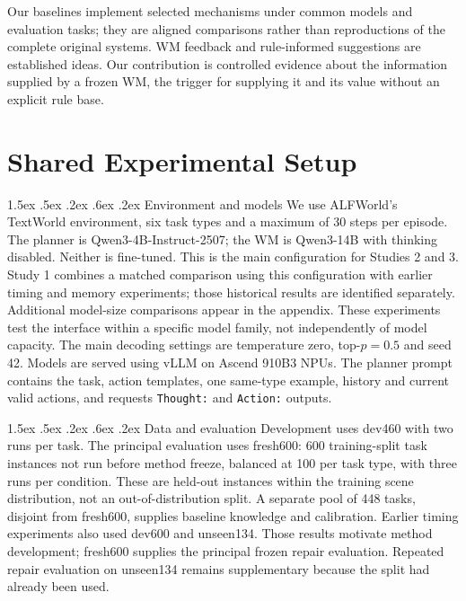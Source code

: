 \documentclass[runningheads]{llncs}
\makeatletter
\renewcommand\paragraph{\@startsection{paragraph}{4}{\z@}%
  {1.5ex \@plus .5ex \@minus .2ex}%
  {.6ex \@plus .2ex}%
  {\normalfont\normalsize\bfseries}}
\makeatother
\begin{document}
Our baselines implement selected mechanisms under common models and evaluation tasks; they are aligned comparisons rather than reproductions of the complete original systems. WM feedback and rule-informed suggestions are established ideas. Our contribution is controlled evidence about the information supplied by a frozen WM, the trigger for supplying it and its value without an explicit rule base.

\section{Shared Experimental Setup}\label{sec:setup}
\paragraph{Environment and models}
We use ALFWorld's TextWorld environment, six task types and a maximum of 30 steps per episode. The planner is Qwen3-4B-Instruct-2507; the WM is Qwen3-14B with thinking disabled. Neither is fine-tuned. This is the main configuration for Studies 2 and 3. Study 1 combines a matched comparison using this configuration with earlier timing and memory experiments; those historical results are identified separately. Additional model-size comparisons appear in the appendix. These experiments test the interface within a specific model family, not independently of model capacity. The main decoding settings are temperature zero, top-$p=0.5$ and seed 42. Models are served using vLLM on Ascend 910B3 NPUs. The planner prompt contains the task, action templates, one same-type example, history and current valid actions, and requests \texttt{Thought:} and \texttt{Action:} outputs.

\paragraph{Data and evaluation}
Development uses dev460 with two runs per task. The principal evaluation uses fresh600: 600 training-split task instances not run before method freeze, balanced at 100 per task type, with three runs per condition. These are held-out instances within the training scene distribution, not an out-of-distribution split. A separate pool of 448 tasks, disjoint from fresh600, supplies baseline knowledge and calibration. Earlier timing experiments also used dev600 and unseen134. Those results motivate method development; fresh600 supplies the principal frozen repair evaluation. Repeated repair evaluation on unseen134 remains supplementary because the split had already been used.
\end{document}
